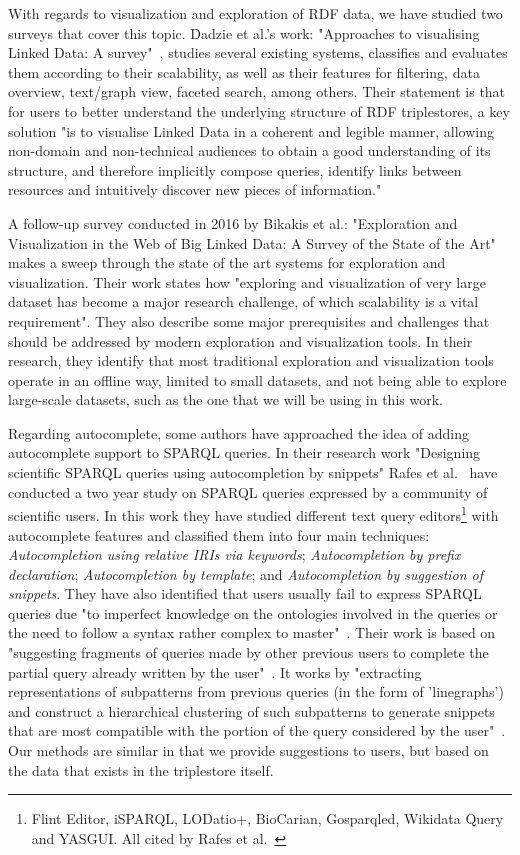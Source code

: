 With regards to visualization and exploration of RDF data, we have studied two surveys that cover this topic. Dadzie et al.'s work: "Approaches to visualising Linked Data: A survey"~\cite{Dadzie2011}, studies several existing systems, classifies and evaluates them according to their scalability, as well as their features for filtering, data overview, text/graph view, faceted search, among others. Their statement is that for users to better understand the underlying structure of RDF triplestores, a key solution "is to visualise Linked Data in a coherent and legible manner, allowing non-domain and non-technical audiences to obtain a good understanding of its structure, and therefore implicitly compose queries, identify links between resources and intuitively discover new pieces of information."

A follow-up survey conducted in 2016 by Bikakis et al.: "Exploration and Visualization in the Web of Big Linked Data: A Survey of the State of the Art"~\cite{Bikakis2016} makes a sweep through the state of the art systems for exploration and visualization. 
Their work states how "exploring and visualization of very large dataset has become a major research challenge, of which scalability is a vital requirement". They also describe some major prerequisites and challenges that should be addressed by modern exploration and visualization tools.
In their research, they identify that most traditional exploration and visualization tools operate in an offline way, limited to small datasets, and not being able to explore large-scale datasets, such as the one that we will be using in this work.

Regarding autocomplete, some authors have approached the idea of adding autocomplete support to SPARQL queries. 
In their research work "Designing scientific SPARQL queries using autocompletion by snippets" Rafes et al.~\cite{Rafes2018} have conducted a two year study on SPARQL queries expressed by a community of scientific users. 
In this work they have studied different text query editors\footnote{Flint Editor, iSPARQL, LODatio+, BioCarian, Gosparqled, Wikidata Query and YASGUI. All cited by Rafes et al.~\cite{Rafes2018}} with autocomplete features and classified them into four main techniques: 
\textit{Autocompletion using relative IRIs via keywords}; 
\textit{Autocompletion by prefix declaration}; 
\textit{Autocompletion by template}; and 
\textit{Autocompletion by suggestion of snippets}. 
They have also identified that users usually fail to express SPARQL queries due "to imperfect knowledge on the ontologies involved in the queries or the need to follow a syntax rather complex to master"~\cite{Rafes2018}. 
Their work is based on "suggesting fragments of queries made by other previous users to complete the partial query already written by the user"~\cite{Rafes2018}.
It works by "extracting representations of subpatterns from previous queries (in the form of 'linegraphs') and construct a hierarchical clustering of such subpatterns to generate snippets that are most compatible with the portion of the query considered by the user"~\cite{Rafes2018}. Our methods are similar in that we provide suggestions to users, but based on the data that exists in the triplestore itself.

